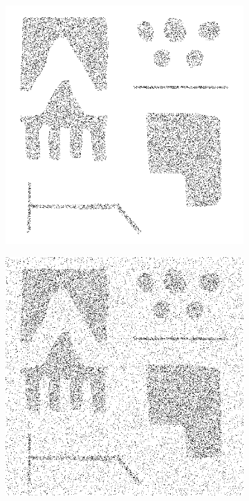 \begin{figure}[tbhp]
	\centering
	\begin{subfigure}[b]{0.3\textwidth}
		\includegraphics[width=\textwidth]{testing-image2a.png}
		\caption{}\label{fig:testing-image2a}
	\end{subfigure}%
	\quad
	\begin{subfigure}[b]{0.3\textwidth}
		\includegraphics[width=\textwidth]{testing-image2b.png}

\end{subfigure}
\end{figure}
